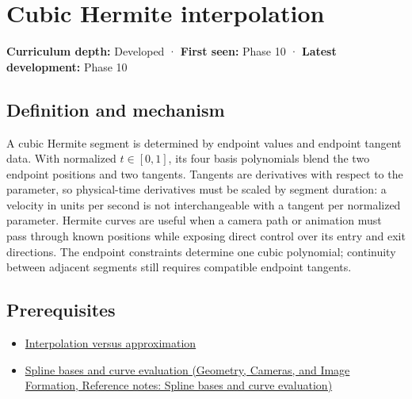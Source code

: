 \hypertarget{appendix-db3aef8f2fd6}{}\label{referencestart:appendix-db3aef8f2fd6}
\section{Cubic Hermite interpolation}\label{appendix-db3aef8f2fd6-cubic-hermite-interpolation}

\textbf{Curriculum depth:} Developed · \textbf{First seen:} Phase 10 · \textbf{Latest development:} Phase 10

\begin{allmightroledefinition}

\subsection{Definition and mechanism}\label{appendix-db3aef8f2fd6-definition-and-mechanism}

A cubic Hermite segment is determined by endpoint values and endpoint tangent data. With normalized \(t\in[0,1]\), its four basis polynomials blend the two endpoint positions and two tangents. Tangents are derivatives with respect to the parameter, so physical-time derivatives must be scaled by segment duration: a velocity in units per second is not interchangeable with a tangent per normalized parameter. Hermite curves are useful when a camera path or animation must pass through known positions while exposing direct control over its entry and exit directions. The endpoint constraints determine one cubic polynomial; continuity between adjacent segments still requires compatible endpoint tangents.

\end{allmightroledefinition}

\subsection{Prerequisites}\label{appendix-db3aef8f2fd6-prerequisites}

\begin{itemize}
\tightlist
\item
  \hyperref[appendix-0c2a5f69851e]{Interpolation versus approximation}
\item
  \href{../03-Geometry-Cameras-and-Image-Formation/main.pdf\#nameddest=appendix-f28eeec97a3d}{Spline bases and curve evaluation (Geometry, Cameras, and Image Formation, Reference notes: Spline bases and curve evaluation)}
\end{itemize}

